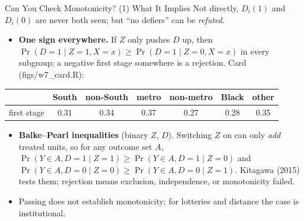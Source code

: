 \documentclass[aspectratio=169,11pt,xcolor=dvipsnames]{beamer}
\newcommand{\srcp}[1]{{\scriptsize\color{gray}(#1)}}
\newcommand{\srct}[1]{#1}
\begin{document}
\begin{frame}{Can You Check Monotonicity? (1) What It Implies}
Not directly, $D_i(1)$ and $D_i(0)$ are never both seen; but ``no defiers'' can be \emph{refuted}.
\begin{itemize}\itemsep3pt
  \item \textbf{One sign everywhere.} If $Z$ only pushes $D$ up, then
        $\Pr(D=1 \mid Z=1, X=x) \ge \Pr(D=1 \mid Z=0, X=x)$ in every subgroup;
        a negative first stage somewhere is a rejection. Card \srcp{figs/w7\_card.R}:
\end{itemize}
\vskip-4pt
\begin{center}\small
\renewcommand{\arraystretch}{1.05}
\begin{tabular}{@{}lcccccc@{}}
\toprule
 & South & non-South & metro & non-metro & Black & other \\
\midrule
first stage & 0.31 & 0.34 & 0.37 & 0.27 & 0.28 & 0.35 \\
\bottomrule
\end{tabular}
\end{center}
\vskip-2pt
\begin{itemize}\itemsep3pt
  \item \textbf{Balke--Pearl inequalities} (binary $Z$, $D$). Switching $Z$ on
        can only \emph{add} treated units, so for any outcome set $A$,
        $\Pr(Y \in A, D=1 \mid Z=1) \ge \Pr(Y \in A, D=1 \mid Z=0)$ and
        $\Pr(Y \in A, D=0 \mid Z=0) \ge \Pr(Y \in A, D=0 \mid Z=1)$.
        \srct{Kitagawa (2015)} tests them; rejection means exclusion,
        independence, or monotonicity failed.
  \item Passing does not establish monotonicity; for lotteries and distance the
        case is institutional.
\end{itemize}
\end{frame}
\end{document}
